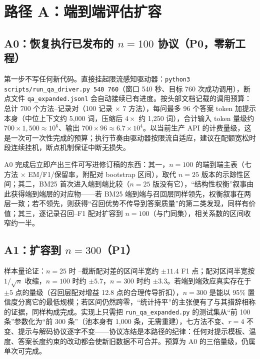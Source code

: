\section{路径 A：端到端评估扩容}

\subsection{A0：恢复执行已发布的 \texorpdfstring{$n{=}100$}{n=100} 协议（P0，零新工程）}

第一步不写任何新代码。直接挂起限流感知驱动器：\texttt{python3 scripts/run\_qa\_driver.py 540 760}（窗口 540 秒、目标 760 次成功调用），断点文件 \texttt{qa\_expanded.jsonl} 会自动接续已有进度。按头部文档记载的调用预算：总计 700 个方法--记录对（100 记录 $\times$ 7 方法），每问最多 96 个答案 token 加提示本身（中位上下文约 5{,}000 词，压缩后 $4\times$ 约 1{,}250 词），合计输入 token 量级约 $700\times1{,}500\approx 10^6$、输出 $700\times 96\approx 6.7\times 10^4$。以当前生产 API 的计费量级，这是一次可一次性完成的预算；执行节奏由驱动器按限流自适应，建议在配额宽松时段连续挂机，断点机制保证中断无损失。

A0 完成后立即产出三件可写进修订稿的东西：其一，$n{=}100$ 的端到端主表（七方法 $\times$ EM/F1/保留率，附配对 bootstrap 区间），取代 $n{=}25$ 版本的示踪性区间；其二，BM25 首次进入端到端比较（$n{=}25$ 版没有它），``结构性权衡''叙事由此获得端到端层的对应物——若 BM25 端到端与召回层同样领先，权衡叙事在两层一致；若不领先，则获得``召回优势不传导到答案质量''的第二类发现，同样有价值；其三，逐记录召回--F1 配对扩容到 $n{=}100$（与门同集），相关系数的区间收窄约一半。

\subsection{A1：扩容到 \texorpdfstring{$n{=}300$}{n=300}（P1）}

样本量论证：$n{=}25$ 时 \sieve{}--截断配对差的区间半宽约 $\pm 11.4$ F1 点；配对区间半宽按 $1/\sqrt{n}$ 收缩，$n{=}100$ 时约 $\pm 5.7$，$n{=}300$ 时约 $\pm 3.3$。若端到端效应真实存在于 $\pm 5$ 点的量级（召回层配对增益 12.8 点的合理传导折扣），$n{=}300$ 是能以 95\% 置信度分离它的最低规模；若区间仍然跨零，``统计持平''的主张便有了与其措辞相称的证据，同样构成完成。实现上只需把 \texttt{run\_qa\_expanded.py} 的测试集从``前 100 条''参数化为``前 300 条''（池本身有 1{,}000 条，无需重建），七方法不变、$r{=}4$ 不变、提示与解码协议逐字不变——协议冻结是本路径的纪律：任何对提示模板、温度、答案长度约束的改动都会使新旧数据不可合并。预算为 A0 的三倍量级，仍属单次可完成。

